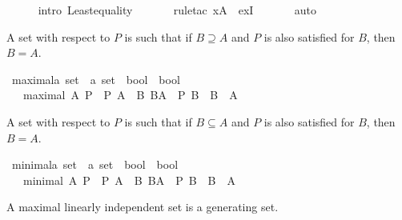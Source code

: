 \begin{isabellebody}
\ \ \ \ \isamarkupfalse%
\ {\isacharparenleft}intro\ Least{\isacharunderscore}equality{\isacharparenright}\isanewline
\ \ \ \ \ \isamarkupfalse%
\ {\isacharparenleft}rule{\isacharunderscore}tac\ x{\isacharequal}{\isachardoublequoteopen}A{\isachardoublequoteclose}\ \ exI{\isacharparenright}\isanewline
\ \ \ \ \ \isamarkupfalse%
\ auto\ \isanewline
{}\isamarkupfalse%
%
\endisatagproof
{\isafoldproof}%
%
\isadelimproof
%
\endisadelimproof
%
\begin{isamarkuptext}%
A  set with respect to $P$ is such that if $B\supseteq A$ and $P$ is also 
satisfied for $B$, then $B=A$.%
\end{isamarkuptext}%
\isamarkuptrue%
\isamarkupfalse%
\ maximal{\isacharcolon}{\isacharcolon}{\isachardoublequoteopen}{\isacharprime}a\ set\ {\isasymRightarrow}\ {\isacharparenleft}{\isacharprime}a\ set\ {\isasymRightarrow}\ bool{\isacharparenright}\ {\isasymRightarrow}\ bool{\isachardoublequoteclose}\isanewline
\ \ \ {\isachardoublequoteopen}maximal\ A\ P\ {\isacharequal}\ {\isacharparenleft}{\isacharparenleft}P\ A{\isacharparenright}\ {\isasymand}\ {\isacharparenleft}{\isasymforall}B{\isachardot}\ B{\isasymsupseteq}A\ {\isasymand}\ P\ B\ {\isasymlongrightarrow}\ B\ {\isacharequal}\ A{\isacharparenright}{\isacharparenright}{\isachardoublequoteclose}%
\begin{isamarkuptext}%
A  set with respect to $P$ is such that if $B\subseteq A$ and $P$ is also 
satisfied for $B$, then $B=A$.%
\end{isamarkuptext}%
\isamarkuptrue%
\isamarkupfalse%
\ minimal{\isacharcolon}{\isacharcolon}{\isachardoublequoteopen}{\isacharprime}a\ set\ {\isasymRightarrow}\ {\isacharparenleft}{\isacharprime}a\ set\ {\isasymRightarrow}\ bool{\isacharparenright}\ {\isasymRightarrow}\ bool{\isachardoublequoteclose}\isanewline
\ \ \ {\isachardoublequoteopen}minimal\ A\ P\ {\isacharequal}\ {\isacharparenleft}{\isacharparenleft}P\ A{\isacharparenright}\ {\isasymand}\ {\isacharparenleft}{\isasymforall}B{\isachardot}\ B{\isasymsubseteq}A\ {\isasymand}\ P\ B\ {\isasymlongrightarrow}\ B\ {\isacharequal}\ A{\isacharparenright}{\isacharparenright}{\isachardoublequoteclose}%
\begin{isamarkuptext}%
A maximal linearly independent set is a generating set.%
\end{isamarkuptext}%
\isamarkuptrue%
\isamarkupfalse%

\end{isabellebody}
